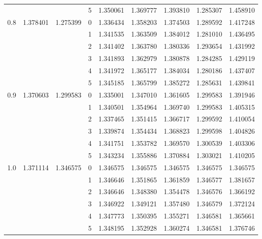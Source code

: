 \begin{tabular}{llllrrrrr}
    &          &          & 5 &  1.350061 &  1.369777 &  1.393810 &  1.285307 &  1.458910 \\
0.8 & 1.378401 & 1.275399 & 0 &  1.336434 &  1.358203 &  1.374503 &  1.289592 &  1.417248 \\
    &          &          & 1 &  1.341535 &  1.363509 &  1.384012 &  1.281010 &  1.436495 \\
    &          &          & 2 &  1.341402 &  1.363780 &  1.380336 &  1.293654 &  1.431992 \\
    &          &          & 3 &  1.341893 &  1.362979 &  1.380878 &  1.284285 &  1.429119 \\
    &          &          & 4 &  1.341972 &  1.365177 &  1.384034 &  1.280186 &  1.437407 \\
    &          &          & 5 &  1.345185 &  1.365799 &  1.385272 &  1.285631 &  1.439841 \\
0.9 & 1.370603 & 1.299583 & 0 &  1.335001 &  1.347010 &  1.361605 &  1.299583 &  1.391946 \\
    &          &          & 1 &  1.340501 &  1.354964 &  1.369740 &  1.299583 &  1.405315 \\
    &          &          & 2 &  1.337465 &  1.351415 &  1.366717 &  1.299592 &  1.410054 \\
    &          &          & 3 &  1.339874 &  1.354434 &  1.368823 &  1.299598 &  1.404826 \\
    &          &          & 4 &  1.341751 &  1.353782 &  1.369570 &  1.300539 &  1.403306 \\
    &          &          & 5 &  1.343234 &  1.355886 &  1.370884 &  1.303021 &  1.410205 \\
1.0 & 1.371114 & 1.346575 & 0 &  1.346575 &  1.346575 &  1.346575 &  1.346575 &  1.346575 \\
    &          &          & 1 &  1.346646 &  1.351865 &  1.361859 &  1.346577 &  1.381657 \\
    &          &          & 2 &  1.346646 &  1.348380 &  1.354478 &  1.346576 &  1.366192 \\
    &          &          & 3 &  1.346922 &  1.349121 &  1.357480 &  1.346579 &  1.372124 \\
    &          &          & 4 &  1.347773 &  1.350395 &  1.355271 &  1.346581 &  1.365661 \\
    &          &          & 5 &  1.348195 &  1.352928 &  1.360274 &  1.346581 &  1.376746 \\
\bottomrule
\end{tabular}
